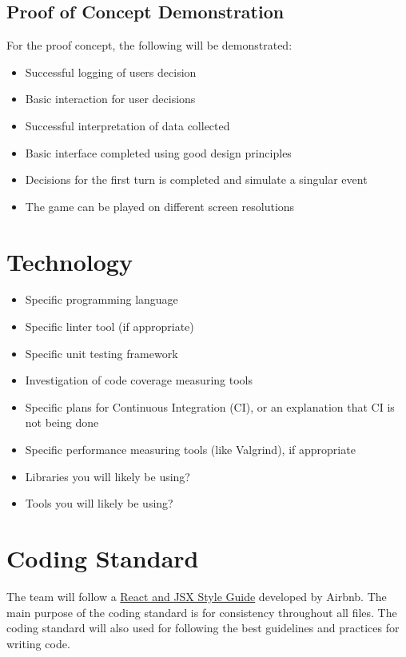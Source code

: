 \documentclass{article}
\begin{document}
\subsection{Proof of Concept Demonstration}
For the proof concept, the following will be demonstrated:
\begin{itemize}
    \item Successful logging of users decision
    \item Basic interaction for user decisions
    \item Successful interpretation of data collected
    \item Basic interface completed using good design principles
    \item Decisions for the first turn is completed and simulate a singular event
    \item The game can be played on different screen resolutions 
\end{itemize}

\section{Technology}

\begin{itemize}
\item Specific programming language
\item Specific linter tool (if appropriate)
\item Specific unit testing framework
\item Investigation of code coverage measuring tools
\item Specific plans for Continuous Integration (CI), or an explanation that CI
  is not being done
\item Specific performance measuring tools (like Valgrind), if
  appropriate
\item Libraries you will likely be using?
\item Tools you will likely be using?
\end{itemize}

\section{Coding Standard}
The team will follow a \href{https://airbnb.io/javascript/react/}{React and JSX Style Guide} developed by Airbnb. The main purpose of the coding standard is for consistency throughout all files. The coding standard will also used for following the best guidelines and practices for writing code.
\end{document}

